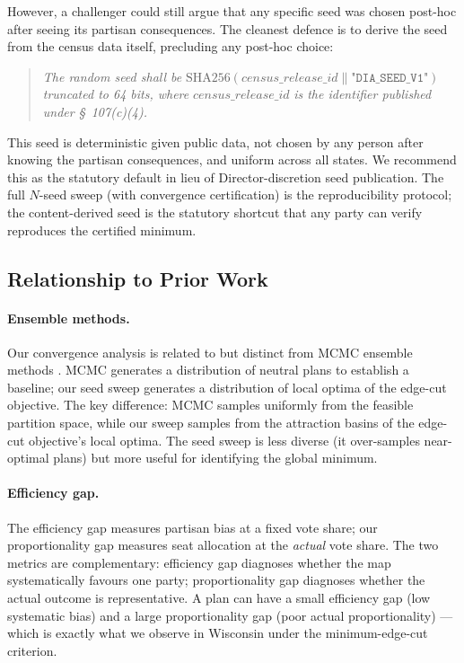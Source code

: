 However, a challenger could still argue that any specific seed was chosen
post-hoc after seeing its partisan consequences. The cleanest defence is to
derive the seed from the census data itself, precluding any post-hoc choice:

\begin{quote}
\emph{The random seed shall be}
$\mathrm{SHA256}(\textit{census\_release\_id} \mathbin\| \texttt{"DIA\_SEED\_V1"})$
\emph{truncated to 64 bits, where}
$\textit{census\_release\_id}$
\emph{is the identifier published under \S~107(c)(4).}
\end{quote}

This seed is deterministic given public data, not chosen by any person after
knowing the partisan consequences, and uniform across all states. We recommend
this as the statutory default in lieu of Director-discretion seed publication.
The full $N$-seed sweep (with convergence certification) is the reproducibility
protocol; the content-derived seed is the statutory shortcut that any party
can verify reproduces the certified minimum.

\subsection{Relationship to Prior Work}

\paragraph{Ensemble methods.}
Our convergence analysis is related to but distinct from MCMC ensemble
methods \citep{chikina2017assessing}. MCMC generates a distribution of neutral
plans to establish a baseline; our seed sweep generates a distribution of
local optima of the edge-cut objective. The key difference: MCMC samples
uniformly from the feasible partition space, while our sweep samples from the
attraction basins of the edge-cut objective's local optima. The seed sweep
is less diverse (it over-samples near-optimal plans) but more useful for
identifying the global minimum.

\paragraph{Efficiency gap.}
The efficiency gap \citep{stephanopoulos2015partisan} measures partisan bias
at a fixed vote share; our proportionality gap measures seat allocation at the
\emph{actual} vote share. The two metrics are complementary: efficiency gap
diagnoses whether the map systematically favours one party; proportionality
gap diagnoses whether the actual outcome is representative. A plan can have a
small efficiency gap (low systematic bias) and a large proportionality gap
(poor actual proportionality) --- which is exactly what we observe in Wisconsin
under the minimum-edge-cut criterion.
